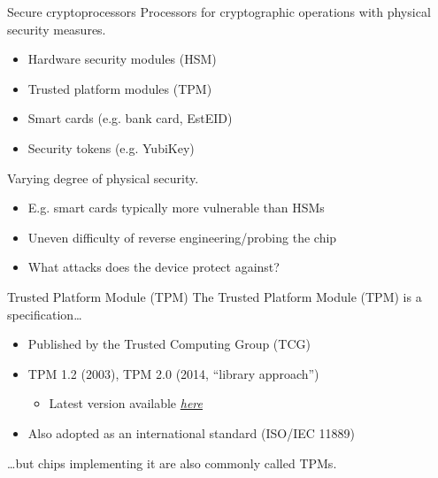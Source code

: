 \begin{frame}{Secure cryptoprocessors}
  Processors for cryptographic operations with physical security measures.
  \begin{itemize}[<+(1)->]
    \item Hardware security modules (HSM)
    \item Trusted platform modules (TPM)
    \item Smart cards (e.g. bank card, EstEID)
    \item Security tokens (e.g. YubiKey)
  \end{itemize}

  \vspace*{1em}

  \pause
  Varying degree of physical security.
  \begin{itemize}[<+(1)->]
    \item E.g. smart cards typically more vulnerable than HSMs
    \item Uneven difficulty of reverse engineering/probing the chip
    \item What attacks does the device protect against?
  \end{itemize}
\end{frame}

\begin{frame}{Trusted Platform Module (TPM)}
  \pause
  The Trusted Platform Module (TPM) is a specification\dots
  \begin{itemize}[<+(1)->]
    \item Published by the Trusted Computing Group (TCG)
    \item TPM 1.2 (2003), TPM 2.0 (2014, \enquote{library approach})
    \par
    \begin{itemize}
      \item Latest version available \href{https://trustedcomputinggroup.org/resource/tpm-library-specification/}{\textit{here}}
    \end{itemize}
    \item Also adopted as an international standard (ISO/IEC 11889)
  \end{itemize}

  \pause
  \dots{}but chips implementing it are also commonly called TPMs.
\end{frame}

